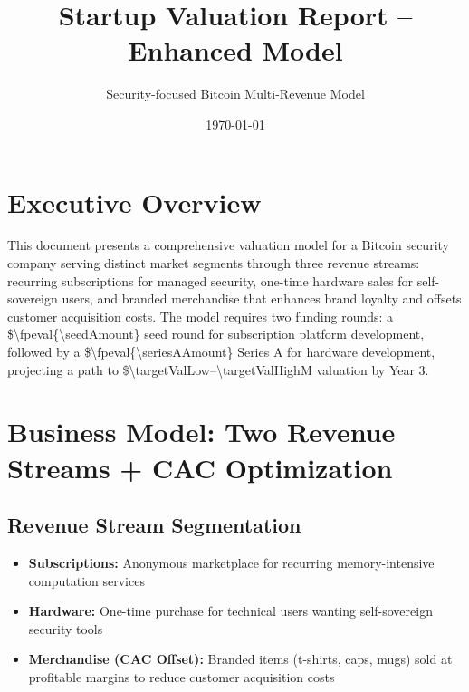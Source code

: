 \documentclass[11pt]{article}
\newcommand{\numint}[1]{\num[round-precision=0]{\fpeval{#1}}}
\begin{document}
\title{Startup Valuation Report -- Enhanced Model}
\author{Security-focused Bitcoin Multi-Revenue Model}
\date{\today}
\maketitle

\section*{Executive Overview}
This document presents a comprehensive valuation model for a Bitcoin security company serving distinct market segments through three revenue streams: recurring subscriptions for managed security, one-time hardware sales for self-sovereign users, and branded merchandise that enhances brand loyalty and offsets customer acquisition costs. The model requires two funding rounds: a \$\numint{\seedAmount} seed round for subscription platform development, followed by a \$\numint{\seriesAAmount} Series A for hardware development, projecting a path to \$\num{\targetValLow}--\num{\targetValHigh}M valuation by Year 3.

\section{Business Model: Two Revenue Streams + CAC Optimization}

\subsection{Revenue Stream Segmentation}
\begin{itemize}
  \item \textbf{Subscriptions:} Anonymous marketplace for recurring memory-intensive computation services
  \item \textbf{Hardware:} One-time purchase for technical users wanting self-sovereign security tools
  \item \textbf{Merchandise (CAC Offset):} Branded items (t-shirts, caps, mugs) sold at profitable margins to reduce customer acquisition costs
\end{itemize}
\end{document}
